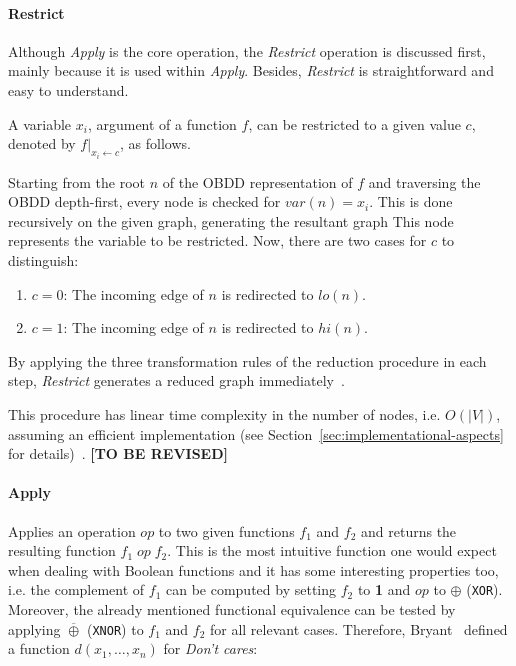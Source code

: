 \documentclass{vldb}
\newcommand{\tbr}{\textbf{[TO BE REVISED]}}
\begin{document}
\paragraph*{Restrict}
\mbox{} %

Although \textit{Apply} is the core operation, the \textit{Restrict} operation is
discussed first, mainly because it is used within \textit{Apply}. Besides,
\textit{Restrict} is straightforward and easy to understand.

A variable $x_i$, argument of a function $f$, can be restricted to a given value
$c$, denoted by $f|_{x_i\leftarrow c}$, as follows.

Starting from the root $n$ of the OBDD representation of $f$ and traversing the
OBDD depth-first, every node is checked for $var(n) = x_i$. This is done recursively
on the given graph, generating the resultant graph This node represents
the variable to be restricted. Now, there are two cases for $c$ to distinguish:
\begin{enumerate}
    \item{$c=0$: The incoming edge of $n$ is redirected to $lo(n)$.}
    \item{$c=1$: The incoming edge of $n$ is redirected to $hi(n)$.}
\end{enumerate}

By applying the three transformation rules of the reduction procedure in each
step, \textit{Restrict} generates a reduced graph immediately~\cite{BRYANT92}.

This procedure has linear time complexity in the number of nodes, i.e. $O(|V|)$,
assuming an efficient implementation (see
Section~\ref{sec:implementational-aspects} for details)~\cite{BRYANT92}. 
\tbr

\paragraph*{Apply}
\mbox{} %

Applies an operation $op$ to two given functions $f_1$ and $f_2$ and returns the
resulting function $f_1\;op\;f_2$. This is the most intuitive function one would
expect when dealing with Boolean functions and it has some interesting properties
too, i.e. the complement of $f_1$ can be computed by setting $f_2$ to \textbf{1}
and $op$ to $\oplus$ (\texttt{XOR}). Moreover, the already mentioned functional
equivalence can be tested by applying $\overline{\oplus}$ (\texttt{XNOR}) to
$f_1$ and $f_2$ for all relevant cases. Therefore, Bryant~\cite{BRYANT92} defined
a function $d(x_1, \ldots, x_n)$ for \textit{Don't cares}:
\end{document}

